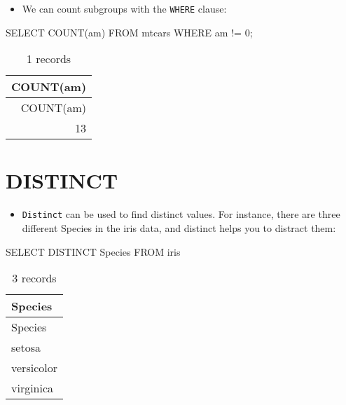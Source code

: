 \documentclass[
  letterpaper,
  DIV=11,
  numbers=noendperiod]{scrreprt}
\newenvironment{Shaded}{\begin{snugshade}}{\end{snugshade}}
\newcommand{\DecValTok}[1]{\textcolor[rgb]{0.68,0.00,0.00}{#1}}
\newcommand{\FunctionTok}[1]{\textcolor[rgb]{0.28,0.35,0.67}{#1}}
\newcommand{\KeywordTok}[1]{\textcolor[rgb]{0.00,0.23,0.31}{#1}}
\newcommand{\NormalTok}[1]{\textcolor[rgb]{0.00,0.23,0.31}{#1}}
\newcommand{\OperatorTok}[1]{\textcolor[rgb]{0.37,0.37,0.37}{#1}}
\providecommand{\tightlist}{%
  \setlength{\itemsep}{0pt}\setlength{\parskip}{0pt}}\usepackage{longtable,booktabs,array}
\begin{document}
\begin{itemize}
\tightlist
\item
  We can count subgroups with the \texttt{WHERE} clause:
\end{itemize}

\begin{Shaded}
\begin{Highlighting}[]
\KeywordTok{SELECT} \FunctionTok{COUNT}\NormalTok{(am) }\KeywordTok{FROM}\NormalTok{ mtcars }\KeywordTok{WHERE}\NormalTok{ am }\OperatorTok{!=} \DecValTok{0}\NormalTok{;}
\end{Highlighting}
\end{Shaded}

\begin{longtable}[]{@{}r@{}}
\caption{1 records}\tabularnewline
\toprule()
COUNT(am) \\
\midrule()
\endfirsthead
\toprule()
COUNT(am) \\
\midrule()
\endhead
13 \\
\bottomrule()
\end{longtable}

\hypertarget{distinct}{%
\section{DISTINCT}\label{distinct}}

\begin{itemize}
\tightlist
\item
  \texttt{Distinct} can be used to find distinct values. For instance,
  there are three different Species in the iris data, and distinct helps
  you to distract them:
\end{itemize}

\begin{Shaded}
\begin{Highlighting}[]
\KeywordTok{SELECT} \KeywordTok{DISTINCT}\NormalTok{ Species }\KeywordTok{FROM}\NormalTok{ iris}
\end{Highlighting}
\end{Shaded}

\begin{longtable}[]{@{}l@{}}
\caption{3 records}\tabularnewline
\toprule()
Species \\
\midrule()
\endfirsthead
\toprule()
Species \\
\midrule()
\endhead
setosa \\
versicolor \\
virginica \\
\bottomrule()
\end{longtable}
\end{document}

